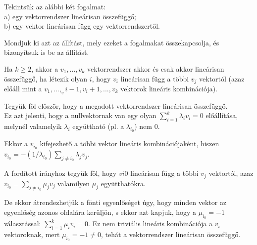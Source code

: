 \begin{frame}
  \begin{tcolorbox}[title={2. (4p)}]
     Tekintsük az alábbi két fogalmat:\\
     a) egy vektorrendszer lineárisan összefüggő;\\
     b) egy vektor lineárisan függ egy vektorrendszertől.\\
     \mmedskip
     
     Mondjuk ki azt az állítást, mely ezeket a fogalmakat összekapcsolja, és bizonyítsuk is be az állítást.
  \tcblower
  
    Ha $k \geq 2$, akkor a $v_1,...,v_k$ vektorrendszer akkor és csak akkor lineárisan összefüggő, ha létezik olyan $i$, hogy $v_i$ lineárisan függ a többi $v_j$ vektortól (azaz előáll mint a $v_1,...,_vi-1,v_i+1,...,v_k$ vektorok lineáris kombinációja).\\
    \mmedskip
    
    Tegyük föl először, hogy a megadott vektorrendszer lineárisan összefüggő.\\
    Ez azt jelenti, hogy a nullvektornak van egy olyan $\sum_{i = 1}^k {\lambda}_iv_i = 0$ előállítása, melynél valamelyik ${\lambda}_i$ együttható (pl. a ${\lambda}_{i_0}$) nem $0$.\\
    \mmedskip
    
    Ekkor a $v_{i_0}$ kifejezhető a többi vektor lineáris kombinációjaként, hiszen $v_{i_0} = -(1/{\lambda}_{i_0})\sum_{j \neq i_0} {\lambda}_jv_j$.\\
    \mmedskip
    
    A fordított irányhoz tegyük föl, hogy $vi0$ lineárisan függ a többi $v_j$ vektortól, azaz $v_{i_0} = \sum_{j \neq i_0} {\mu}_jv_j$ valamilyen ${\mu}_j$ együtthatókra.\\
    \mmedskip
    
    De ekkor átrendezhetjük a fönti egyenlőséget úgy, hogy minden vektor az egyenlőség azonos oldalára kerüljön, s ekkor azt kapjuk, hogy a ${\mu}_{i_0} = -1$ választással: $\sum_{i = 1}^k {\mu}_iv_i = 0$. Ez nem triviális lineáris kombinációja a $v_i$ vektoroknak, mert ${\mu}_{i_0} = -1 \neq 0$, tehát a vektorrendszer lineárisan összefüggő.
  \end{tcolorbox}
\end{frame}


